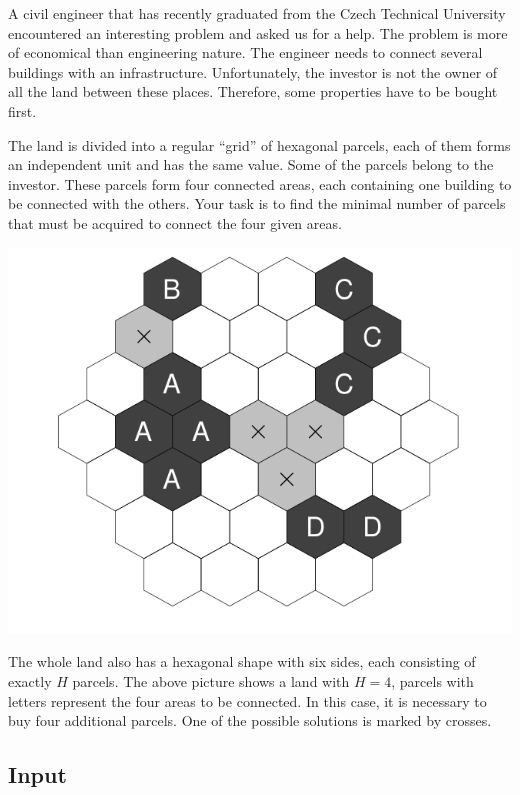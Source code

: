 A civil engineer that has recently graduated from the Czech Technical University
encountered an interesting problem and asked us for a help. The problem is more
of economical than engineering nature. The engineer needs to connect several
buildings with an infrastructure. Unfortunately, the investor is not the owner
of all the land between these places. Therefore, some properties have to be
bought first.

The land is divided into a regular ``grid'' of hexagonal parcels, each of them
forms an independent unit and has the same value. Some of the parcels belong to
the investor. These parcels form four connected areas, each containing one
building to be connected with the others. Your task is to find the minimal
number of parcels that must be acquired to connect the four given areas.

\begin{center}
\includegraphics[scale=0.3]{problems/hexagonal/imagens/hex.png}
\end{center}

The whole land also has a hexagonal shape with six sides, each consisting of
exactly $H$ parcels. The above picture shows a land with $H = 4$, parcels with
letters represent the four areas to be connected. In this case, it is necessary
to buy four additional parcels. One of the possible solutions is marked by
crosses.

\subsection*{Input}

